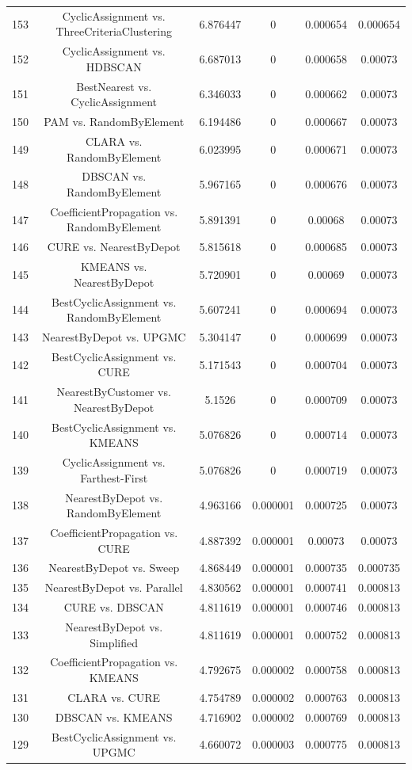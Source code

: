 \documentclass[a4paper,10pt]{article}
\begin{document}
\begin{landscape}
\begin{table}[!htp]
\begin{tabular}{cccccc}
153&CyclicAssignment vs. ThreeCriteriaClustering&6.876447&0&0.000654&0.000654\\
152&CyclicAssignment vs. HDBSCAN&6.687013&0&0.000658&0.00073\\
151&BestNearest vs. CyclicAssignment&6.346033&0&0.000662&0.00073\\
150&PAM vs. RandomByElement&6.194486&0&0.000667&0.00073\\
149&CLARA vs. RandomByElement&6.023995&0&0.000671&0.00073\\
148&DBSCAN vs. RandomByElement&5.967165&0&0.000676&0.00073\\
147&CoefficientPropagation vs. RandomByElement&5.891391&0&0.00068&0.00073\\
146&CURE vs. NearestByDepot&5.815618&0&0.000685&0.00073\\
145&KMEANS vs. NearestByDepot&5.720901&0&0.00069&0.00073\\
144&BestCyclicAssignment vs. RandomByElement&5.607241&0&0.000694&0.00073\\
143&NearestByDepot vs. UPGMC&5.304147&0&0.000699&0.00073\\
142&BestCyclicAssignment vs. CURE&5.171543&0&0.000704&0.00073\\
141&NearestByCustomer vs. NearestByDepot&5.1526&0&0.000709&0.00073\\
140&BestCyclicAssignment vs. KMEANS&5.076826&0&0.000714&0.00073\\
139&CyclicAssignment vs. Farthest-First&5.076826&0&0.000719&0.00073\\
138&NearestByDepot vs. RandomByElement&4.963166&0.000001&0.000725&0.00073\\
137&CoefficientPropagation vs. CURE&4.887392&0.000001&0.00073&0.00073\\
136&NearestByDepot vs. Sweep&4.868449&0.000001&0.000735&0.000735\\
135&NearestByDepot vs. Parallel&4.830562&0.000001&0.000741&0.000813\\
134&CURE vs. DBSCAN&4.811619&0.000001&0.000746&0.000813\\
133&NearestByDepot vs. Simplified&4.811619&0.000001&0.000752&0.000813\\
132&CoefficientPropagation vs. KMEANS&4.792675&0.000002&0.000758&0.000813\\
131&CLARA vs. CURE&4.754789&0.000002&0.000763&0.000813\\
130&DBSCAN vs. KMEANS&4.716902&0.000002&0.000769&0.000813\\
129&BestCyclicAssignment vs. UPGMC&4.660072&0.000003&0.000775&0.000813\\

\end{tabular}
\end{table}
\end{landscape}
\end{document}
